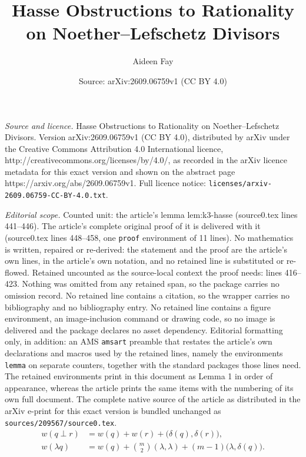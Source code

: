 \documentclass[10pt,a4paper]{amsart}
\title{Hasse Obstructions to Rationality on Noether--Lefschetz Divisors}
\author{Aideen Fay}
\date{Source: arXiv:2609.06759v1 (CC BY 4.0)}
\begin{document}
\maketitle

\noindent\emph{Source and licence.} Hasse Obstructions to Rationality on Noether--Lefschetz Divisors. Version arXiv:2609.06759v1 (CC BY 4.0), distributed by arXiv under the Creative Commons Attribution 4.0 International licence, http://creativecommons.org/licenses/by/4.0/, as recorded in the arXiv licence metadata for this exact version and shown on the abstract page https://arxiv.org/abs/2609.06759v1. Full licence notice: \texttt{licenses/arxiv-2609.06759-CC-BY-4.0.txt}.\par\smallskip

\noindent\textit{Editorial scope.} Counted unit: the article's lemma lem:k3-hasse (source0.tex lines 441--446). The article's complete original proof of it is delivered with it (source0.tex lines 448--458, one \texttt{proof} environment of 11 lines). No mathematics is written, repaired or re-derived: the statement and the proof are the article's own lines, in the article's own notation, and no retained line is substituted or re-flowed.  Retained uncounted as the source-local context the proof needs: lines 416--423.  Nothing was omitted from any retained span, so the package carries no omission record.  No retained line contains a citation, so the wrapper carries no bibliography and no bibliography entry.  No retained line contains a figure environment, an image-inclusion command or drawing code, so no image is delivered and the package declares no asset dependency.  Editorial formatting only, in addition: an AMS \texttt{amsart} preamble that restates the article's own declarations and macros used by the retained lines, namely the environments \texttt{lemma} on separate counters, together with the standard packages those lines need.  The retained environments print in this document as Lemma 1 in order of appearance, whereas the article prints the same items with the numbering of its own full document.  The complete native source of the article as distributed in the arXiv e-print for this exact version is bundled unchanged as \texttt{sources/209567/source0.tex}.
\begin{align}
w(q\perp r)
&=w(q)+w(r)+\bigl(\delta(q),\delta(r)\bigr),
\label{eq:sum}\\
w(\lambda q)
&=w(q)+\binom{m}{2}(\lambda,\lambda)
+(m-1)\bigl(\lambda,\delta(q)\bigr).
\label{eq:scale}\end{align} 
\end{document}
